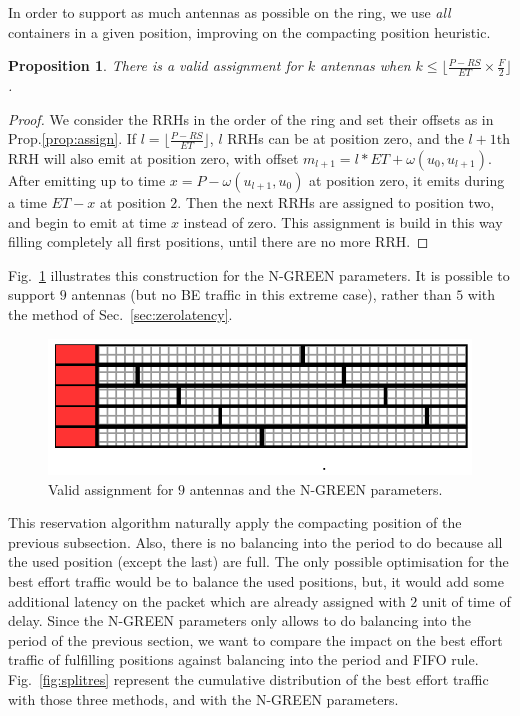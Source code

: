 \documentclass[10pt, conference, letterpaper]{IEEEtran}
\newtheorem{prop}{Proposition}
\begin{document}
In order to support as much antennas as possible on the ring, we use \emph{all} containers in a given position, improving on the compacting position heuristic. 

\begin{prop}
 There is a valid assignment for $k$ antennas when $k \leq \lfloor \frac{P- RS}{ET} \times \frac{F}{2}\rfloor$.
\end{prop}
\begin{proof}
 We consider the RRHs in the order of the ring and set their offsets as in Prop.\ref{prop:assign}.
 If $l = \lfloor \frac{P- RS}{ET}\rfloor$, $l$ RRHs can be at position zero, and the $l+1$th
 RRH will also emit at position zero, with offset $m_{l+1} = l*ET + \omega(u_0,u_{l+1})$. 
 After emitting up to time $x = P - \omega(u_{l+1},u_{0})$ at position zero, it emits during a time $ET -x $  at position $2$. Then the next RRHs are assigned to position two, and begin to emit at time $x$ instead of zero. This assignment is build in this way filling completely all first positions, until there are no more RRH.  
\end{proof}

Fig.~\ref{fig:split} illustrates this construction for the N-GREEN parameters. 
It is possible to support $9$ antennas (but no BE traffic in this extreme case),
rather than $5$ with the method of Sec.~\ref{sec:zerolatency}.


\begin{figure}[h!]
\begin{center}   

      \includegraphics[scale=0.8]{split}
     \caption{Valid assignment for $9$ antennas and the N-GREEN parameters.}   \label{fig:split}
\end{center}
  \end{figure}
  
  This reservation algorithm naturally apply the compacting position of the previous subsection. Also, there is no balancing into the period to do because all the used position (except the last) are full. The only possible optimisation for the best effort traffic would be to balance the used positions, but, it would add some additional latency on the packet which are already assigned with $2$ unit of time of delay.
  Since the N-GREEN parameters only allows to do balancing into the period of the previous section, we want to compare the impact on the best effort traffic of fulfilling positions against balancing into the period and FIFO rule. 
Fig.~\ref{fig:splitres} represent the cumulative distribution of the best effort traffic with those three methods, and with the N-GREEN parameters.
\end{document}
